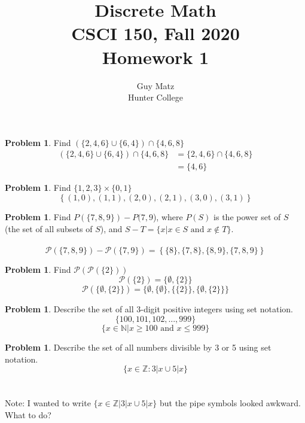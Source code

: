 \documentclass[10pt,leqno ]{article}
\title{Discrete Math\\
CSCI 150, Fall 2020\\
Homework 1}
\author{Guy Matz \\
Hunter College}
\theoremstyle{definition}
\newtheorem{problem}[theorem]{Problem}
\begin{document}
\begin{problem} Find $(\{2,4,6\} \cup  \{6,4\}) \cap \{4,6,8\}$
\\
\Large
\begin{align*}
(\{2,4,6\} \cup  \{6,4\}) \cap \{4,6,8\} &= \{2,4,6\} \cap \{4,6,8\}\\
        &=  \{4,6\}
\end{align*}
\end{problem}
\newpage

\begin{problem} Find $\{1,2,3\} \times \{0,1\}$
\\
\Large
$$\left\{ (1,0), (1,1), (2,0), (2,1), (3,0), (3,1) \right\}$$
\end{problem}
\newpage
\begin{problem} Find $P(\{7,8,9\})-P({7,9}$), where $P(S)$ is the power set of $S$ (the set of all subsets of $S$), and $S-T = \{x|x \in S \text{ and } x \notin T\}$.
\\\\
\Large
$$\mathcal{P}(\{7,8,9\}) - \mathcal{P}(\{7,9\}) = \left\{ \{8\}, \{7,8\}, \{8, 9\} , \{7,8,9\} \right\}$$
\end{problem}
\newpage
\begin{problem} Find $\mathcal{P}(\mathcal{P}(\{2\}))$
\\
\Large
$$\mathcal{P}(\{2\}) = \{\emptyset, \{2\}\}$$
$$\mathcal{P}(\{\emptyset, \{2\}\}) = \{\emptyset, \{ \emptyset \}, \{\{2\}\}, \{\emptyset, \{2\}\}\}$$
\end{problem}
\newpage
\begin{problem} Describe the set of all 3-digit positive integers using set notation.
\\
\Large
$$\{100, 101, 102, ... , 999\}$$
$$ \{ x \in \mathbb{N}| x \geq 100 \text{ and } x \leq 999 \}$$
\end{problem}
\newpage
\begin{problem} Describe the set of all numbers divisible by 3 or 5 using set notation.
\\
\Large
$$\{x \in \mathbb{Z}: 3 | x \cup 5|x \}$$
\\\\
Note: I wanted to write $\{x \in \mathbb{Z}| 3 | x \cup 5|x \}$ but the pipe symbols looked awkward.  What to do?
\end{problem}
\newpage
\end{document}
